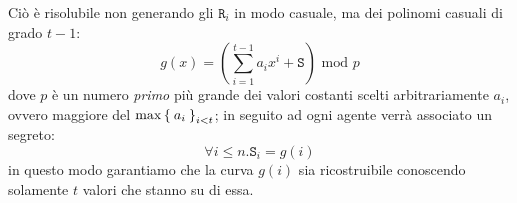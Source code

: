 Ciò è risolubile non generando gli $\mathtt R_i$ in modo casuale, ma dei polinomi
casuali di grado $t-1$:
\[g(x)=(\sum_{i=1}^{t-1} a_ix^i+\mathtt S)\text{ mod  } p\]
dove $p$ è un numero \textit{primo} più grande dei valori costanti scelti arbitrariamente
$a_i$, ovvero maggiore del $\max \Set{a_i}_{i< t}$; in seguito ad
ogni agente verrà associato un segreto:
\[\forall i\leq n. \mathtt S_i = g(i)\]
in questo modo garantiamo che la curva $g(i)$ sia ricostruibile conoscendo 
solamente $t$ valori che stanno su di essa.
